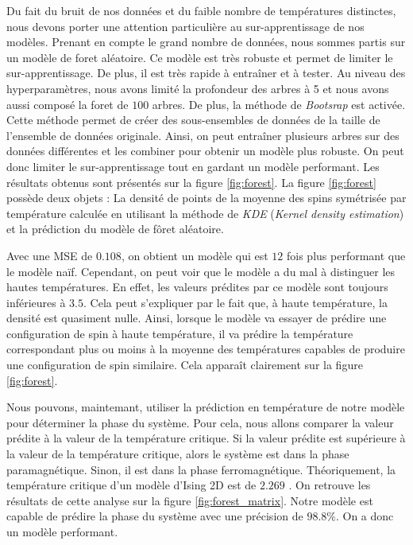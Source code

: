 \documentclass[11pt, parskip=half]{scrartcl} %
\begin{document}
Du fait du bruit de nos données et du faible nombre de températures distinctes, nous devons porter une attention particulière au sur-apprentissage de nos modèles.
Prenant en compte le grand nombre de données, nous sommes partis sur un modèle de foret aléatoire. Ce modèle est très robuste et permet de limiter le sur-apprentissage. De plus, il est très rapide à entraîner et à tester.
Au niveau des hyperparamètres, nous avons limité la profondeur des arbres à 5 et nous avons aussi composé la foret de $100$ arbres. De plus, la méthode de \textit{Bootsrap} est activée. Cette méthode permet de créer des sous-ensembles de données de la taille de l'ensemble de données originale. Ainsi, on peut entraîner plusieurs arbres sur des données différentes et les combiner pour obtenir un modèle plus robuste.
On peut donc limiter le sur-apprentissage tout en gardant un modèle performant. Les résultats obtenus sont présentés sur la figure \ref{fig:forest}.
La figure \ref{fig:forest} possède deux objets : La densité de points de la moyenne des spins symétrisée par température calculée en utilisant la méthode de \textit{KDE} (\textit{Kernel density estimation}) et la prédiction du modèle de fôret aléatoire.

Avec une MSE de $0.108$, on obtient un modèle qui est $12$ fois plus performant que le modèle naïf. Cependant, on peut voir que le modèle a du mal à distinguer les hautes températures. En effet, les valeurs prédites par ce modèle sont toujours inférieures à $3.5$.
Cela peut s'expliquer par le fait que, à haute température, la densité est quasiment nulle. Ainsi, lorsque le modèle va essayer de prédire une configuration de spin à haute température, il va prédire la température correspondant plus ou moins à la moyenne des températures capables de produire une configuration de spin similaire. Cela apparaît clairement sur la figure \ref{fig:forest}.

Nous pouvons, maintemant, utiliser la prédiction en température de notre modèle pour déterminer la phase du système. Pour cela, nous allons comparer la valeur prédite à la valeur de la température critique. Si la valeur prédite est supérieure à la valeur de la température critique, alors le système est dans la phase paramagnétique. Sinon, il est dans la phase ferromagnétique.
Théoriquement, la température critique d'un modèle d'Ising 2D est de $2.269$ \cite{aviles_critical_2023}. On retrouve les résultats de cette analyse sur la figure \ref{fig:forest_matrix}.  Notre modèle est capable de prédire la phase du système avec une précision de $98.8\%$. On a donc un modèle performant.
\end{document}
